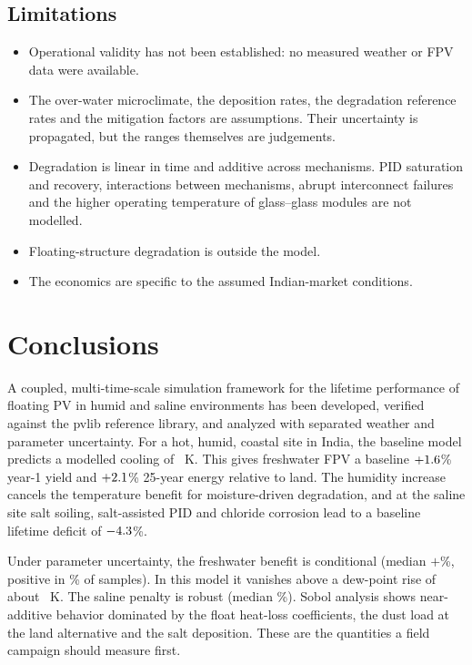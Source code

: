 \documentclass[preprint,11pt]{elsarticle}
\begin{document}
\subsection{Limitations}
\begin{itemize}
\item Operational validity has not been established: no measured weather or FPV data were available.
\item The over-water microclimate, the deposition rates, the degradation reference rates and the mitigation factors are
assumptions. Their uncertainty is propagated, but the ranges themselves are judgements.
\item Degradation is linear in time and additive across mechanisms. PID saturation and recovery, interactions between
mechanisms, abrupt interconnect failures and the higher operating temperature of glass--glass modules are not modelled.
\item Floating-structure degradation is outside the model.
\item The economics are specific to the assumed Indian-market conditions.
\end{itemize}

\section{Conclusions}\label{sec:conclusion}
A coupled, multi-time-scale simulation framework for the lifetime performance of floating PV in humid and saline
environments has been developed, verified against the pvlib reference library, and analyzed with separated weather and
parameter uncertainty. For a hot, humid, coastal site in India, the baseline model predicts a modelled cooling of
\dTdayF~K. This gives freshwater FPV a baseline $+1.6$\% year-1 yield and $+2.1$\% 25-year energy
relative to land. The humidity increase cancels the temperature benefit for moisture-driven degradation, and at the
saline site salt soiling, salt-assisted PID and chloride corrosion lead to a baseline lifetime deficit of $-4.3$\%.

Under parameter uncertainty, the freshwater benefit is conditional (median $+$\MCLifeMedF\%, positive in \MCLifePosF\% of
samples). In this model it vanishes above a dew-point rise of about \DTdStar~K. The saline penalty is robust (median
\MCLifeMedS\%). Sobol analysis shows near-additive behavior dominated by the float heat-loss coefficients, the dust load
at the land alternative and the salt deposition. These are the quantities a field campaign should measure first.
\end{document}
